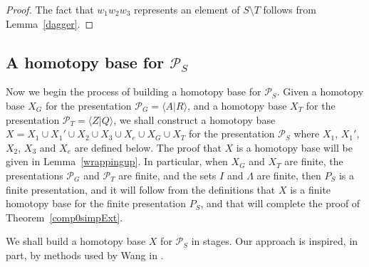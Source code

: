 \documentclass[11pt]{amsart}
\theoremstyle{plain}
\begin{document}
\begin{proof}
The fact that $w_1 w_2 w_3$ represents an element of $S \setminus T$ follows from Lemma~\ref{dagger}.
\end{proof}

\subsection*{\boldmath A homotopy base for $\mathcal{P}_S$}

Now we begin the process of building a homotopy base for ${\mathcal{P}}_S$. Given a homotopy base $X_G$ for the presentation $\mathcal{P}_G = {\langle} A | R {\rangle}$, and a homotopy base $X_T$ for the presentation $\mathcal{P}_T = {\langle} Z | Q {\rangle}$, we shall construct a homotopy base $X = X_1 \cup X_1' \cup X_2 \cup X_3 \cup X_e \cup X_G \cup X_T$ for the presentation $\mathcal{P}_S$ where $X_1$, $X_1'$, $X_2$, $X_3$ and $X_e$ are defined below. The proof that $X$ is a homotopy base will be given in Lemma~\ref{wrappingup}. In particular, when $X_G$ and $X_T$ are finite, the presentations $\mathcal{P}_G$ and $\mathcal{P}_T$ are finite, and the sets $I$ and $\Lambda$ are finite, then $P_S$ is a finite presentation, and it will follow from the definitions that $X$ is a finite homotopy base for the finite presentation $P_S$, and that will complete the proof of Theorem~\ref{comp0simpExt}.

We shall build a homotopy base $X$ for ${\mathcal{P}}_S$ in stages. Our approach is inspired, in part, by methods used by Wang in \cite{Wang1}. 

\
\end{document}
